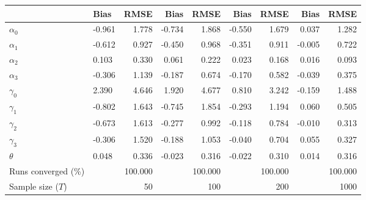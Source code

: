 
\begin{tabular}[t]{llrrrrrrr}
\toprule
  & Bias & RMSE & Bias & RMSE & Bias & RMSE & Bias & RMSE\\
\midrule
$\alpha_{0}$ & -0.961 & 1.778 & -0.734 & 1.868 & -0.550 & 1.679 & 0.037 & 1.282\\
$\alpha_{1}$ & -0.612 & 0.927 & -0.450 & 0.968 & -0.351 & 0.911 & -0.005 & 0.722\\
$\alpha_{2}$ & 0.103 & 0.330 & 0.061 & 0.222 & 0.023 & 0.168 & 0.016 & 0.093\\
$\alpha_{3}$ & -0.306 & 1.139 & -0.187 & 0.674 & -0.170 & 0.582 & -0.039 & 0.375\\
$\gamma_{0}$ & 2.390 & 4.646 & 1.920 & 4.677 & 0.810 & 3.242 & -0.159 & 1.488\\
$\gamma_{1}$ & -0.802 & 1.643 & -0.745 & 1.854 & -0.293 & 1.194 & 0.060 & 0.505\\
$\gamma_{2}$ & -0.673 & 1.613 & -0.277 & 0.992 & -0.118 & 0.784 & -0.010 & 0.313\\
$\gamma_{3}$ & -0.306 & 1.520 & -0.188 & 1.053 & -0.040 & 0.704 & 0.055 & 0.327\\
$\theta$ & 0.048 & 0.336 & -0.023 & 0.316 & -0.022 & 0.310 & 0.014 & 0.316\\
Runs converged (\%) &  & 100.000 &  & 100.000 &  & 100.000 &  & 100.000\\
Sample size ($T$) &  & 50 &  & 100 &  & 200 &  & 1000\\
\bottomrule
\end{tabular}
